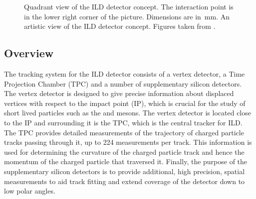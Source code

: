 \begin{figure}[h!]
\centering
{}
\caption[\protect{} Quadrant view of the ILD detector concept.  The interaction point is in the lower right corner of the picture.  Dimensions are in~mm.  \protect{} An artistic view of the ILD detector concept.  Figures taken from  \cite{Behnke:2013lya}.]{\protect{} Quadrant view of the ILD detector concept.  The interaction point is in the lower right corner of the picture.  Dimensions are in~mm.  \protect{} An artistic view of the ILD detector concept.  Figures taken from  \cite{Behnke:2013lya}.}
\label{fig:ild}
\end{figure} 


\subsection{Overview}
The tracking system for the ILD detector consists of a vertex detector, a Time Projection Chamber (TPC) and a number of supplementary silicon detectors.  The vertex detector is designed to give precise information about displaced vertices with respect to the impact point (IP), which is crucial for the study of short lived particles such as the \PD and \PB mesons.  The vertex detector is located close to the IP and surrounding it is the TPC, which is the central tracker for ILD.  The TPC provides detailed measurements of the trajectory of charged particle tracks passing through it, up to 224 measurements per track.  This information is used for determining the curvature of the charged particle track and hence the momentum of the charged particle that traversed it.  Finally, the purpose of the supplementary silicon detectors is to provide additional, high precision, spatial measurements to aid track fitting and extend coverage of the detector down to low polar angles.  

